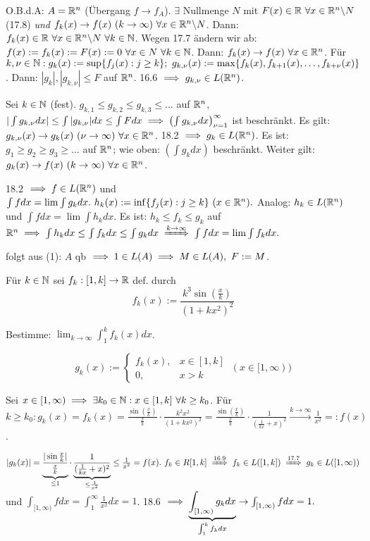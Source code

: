 \documentclass[a4paper,twoside,DIV15,BCOR12mm]{scrbook}
\begin{document}
\begin{beweis}
\begin{liste}
\item O.B.d.A: $A=\mathbb{R}^n$ (Übergang $f\to f_A$). $\exists$ Nullmenge $N$ mit $F(x)\in\mathbb{R}\ \forall x\in\mathbb{R}^n\backslash N$ (17.8) \emph{und} $f_k(x)\to f(x)\ (k\to\infty)\ \forall x\in\MdR^n\backslash N$. Dann: $f_k(x)\in\MdR\ \forall x\in\MdR^n\backslash N\ \forall k\in\MdN$. Wegen 17.7 ändern wir ab: $f(x):=f_k(x):=F(x):=0\ \forall x\in N\ \forall k\in\mathbb{N}$. Dann: $f_k(x)\to f(x)\ \forall x\in\MdR^n$. Für $k,\nu \in\MdN: g_k(x):=\sup\{f_j(x):j\ge k\};\ g_{k,\nu}(x):=\max\{f_k(x),f_{k+1}(x),\ldots,f_{k+\nu}(x)\}$. Dann: $|g_k|,|g_{k,\nu}|\le F$ auf $\mathbb{R}^n$. 16.6 $\implies g_{k,\nu} \in L(\mathbb{R}^n)$.

Sei $k\in\mathbb{N}$ (fest). $g_{k,1}\le g_{k,2}\le g_{k,3}\le \ldots$ auf $\mathbb{R}^n$, $|\int g_{k,\nu}dx|\le\int|g_{k,\nu}|dx\le\int Fdx \implies \left(\int g_{k,\nu}dx\right)_{\nu=1}^\infty$ ist beschränkt. Es gilt: $g_{k,\nu}(x)\to g_k(x)\ (\nu\to\infty)\ \forall x\in\MdR^n$. 18.2 $\implies g_k\in L(\mathbb{R}^n)$. Es ist: $g_1\ge g_2\ge g_3\ge \ldots$ auf $\mathbb{R}^n$; wie oben: $\left(\int g_kdx\right)$ beschränkt. Weiter gilt: $g_k(x)\to f(x)\ (k\to\infty)\ \forall x\in\MdR^n$.

18.2 $\implies f\in L(\mathbb{R}^n)$ und $\int fdx = \lim\int g_kdx.\ h_k(x):=\inf\{f_j(x):j\ge k\}\ (x\in\MdR^n).$ Analog: $h_k\in L(\mathbb{R}^n)$ und $\int fdx=\lim\int h_kdx$. Es ist: $h_k\le f_k\le g_k$ auf $\MdR^n \folgt \int h_kdx\le\int f_kdx\le\int g_kdx \folgtwegen{k\to\infty} \int fdx = \lim\int f_kdx.$

\item folgt aus (1): $A$ qb $\folgt 1\in L(A) \folgt M\in L(A),\ F:=M$.
\end{liste}
\end{beweis}

\begin{beispiel}
Für $k\in\mathbb{N}$ sei $f_k:[1,k]\to\mathbb{R}$ def. durch $$f_k(x):=\frac{k^3\sin(\frac{x}{k})}{(1+kx^2)^2}$$

Bestimme: $\lim_{k\to\infty}\int_1^k f_k(x)dx$.

$$g_k(x):=\begin{cases}
f_k(x), & x\in[1,k]\\
0,      & x>k
\end{cases}\ (x\in[1,\infty))$$

Sei $x\in[1,\infty) \implies \exists k_0\in\mathbb{N}: x\in[1,k]\ \forall k\ge k_0$. Für $k\ge k_0:g_k(x)=f_k(x)=\frac{\sin(\frac{x}{k})}{\frac{x}{k}}\cdot\frac{k^2x^2}{(1+kx^2)^2} = \frac{\sin(\frac{x}{k})}{\frac{x}{k}}\cdot\frac{1}{(\frac{1}{kx}+x)^2} \overset{k\to\infty}{\to} \frac{1}{x^2} =: f(x)$.

$|g_k(x)| = \underbrace{\frac{|\sin\frac{x}{k}|}{\frac{x}{k}}}_{\le 1} \cdot \underbrace{\frac{1}{(\frac{1}{kx}+x)^2}}_{\le \frac{1}{x^2}} \le \frac{1}{x^2} = f(x).\ f_k\in R[1,k] \folgtnach{16.9} f_k\in L([1,k]) \folgtnach{17.7} g_k\in L([1,\infty))$ und $\int_{[1,\infty)} fdx = \int_1^\infty \frac{1}{x^2}dx = 1$. 18.6 $\implies \underbrace{\int_{[1,\infty)} g_kdx}_{\int_1^k f_kdx} \to \int_{[1,\infty)} fdx = 1.$
\end{beispiel}
\end{document}
